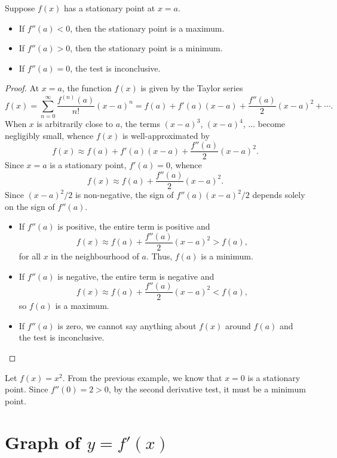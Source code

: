 \begin{proposition}\label{prop:Second-Derivative-Test}
    Suppose $f(x)$ has a stationary point at $x = a$.
    \begin{itemize}
        \item If $f''(a) < 0$, then the stationary point is a maximum.
        \item If $f''(a) > 0$, then the stationary point is a minimum.
        \item If $f''(a) = 0$, the test is inconclusive.
    \end{itemize}
\end{proposition}
\begin{proof}
    At $x = a$, the function $f(x)$ is given by the Taylor series \[f(x) = \sum_{n = 0}^\infty \frac{f^{(n)}(a)}{n!} (x-a)^n = f(a) + f'(a) (x-a) + \frac{f''(a)}{2} (x-a)^2 + \cdots.\] When $x$ is arbitrarily close to $a$, the terms $(x-a)^3$, $(x-a)^4$, $\dots$ become negligibly small, whence $f(x)$ is well-approximated by \[f(x) \approx f(a) + f'(a) (x-a) + \frac{f''(a)}{2} (x-a)^2.\] Since $x = a$ is a stationary point, $f'(a) = 0$, whence \[f(x) \approx f(a) + \frac{f''(a)}{2} (x-a)^2.\] Since $(x-a)^2/2$ is non-negative, the sign of $f''(a) (x-a)^2/2$ depends solely on the sign of $f''(a)$.
    \begin{itemize}
        \item If $f''(a)$ is positive, the entire term is positive and \[f(x) \approx f(a) + \frac{f''(a)}{2} (x-a)^2 > f(a),\] for all $x$ in the neighbourhood of $a$. Thus, $f(a)$ is a minimum.
        \item If $f''(a)$ is negative, the entire term is negative and \[f(x) \approx f(a) + \frac{f''(a)}{2} (x-a)^2 < f(a),\] so $f(a)$ is a maximum.
        \item If $f''(a)$ is zero, we cannot say anything about $f(x)$ around $f(a)$ and the test is inconclusive.
    \end{itemize}
\end{proof}

\begin{example}
    Let $f(x) = x^2$. From the previous example, we know that $x = 0$ is a stationary point. Since $f''(0) = 2 > 0$, by the second derivative test, it must be a minimum point.
\end{example}

\section{Graph of \texorpdfstring{$y = f'(x)$}{y = f'(x)}}

